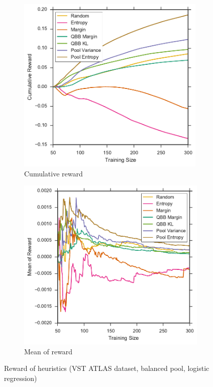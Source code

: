 \begin{figure}[p]
	\centering
	\begin{subfigure}{.5\textwidth}
		\centering
		\includegraphics[width=0.99\textwidth]{figures/5_thompson/vstatlas_bl_sum_rewards}
		\caption{Cumulative reward}
		\label{fig:vstatlas_bl_sum_rewards}
	\end{subfigure}%
	\begin{subfigure}{.5\textwidth}
		\centering
		\includegraphics[width=0.99\linewidth]{figures/5_thompson/vstatlas_bl_avg_rewards}
		\caption{Mean of reward}
		\label{fig:vstatlas_bl_avg_rewards}
	\end{subfigure}
	\caption[Reward of heuristics (VST ATLAS, balanced, logistic)]{
		Reward of heuristics (VST ATLAS dataset, balanced pool, logistic regression)}
	\label{fig:vstatlas_bl_rewards}
\end{figure}

